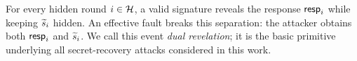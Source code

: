For every hidden round $i\in\mathcal{H}$, a valid signature reveals the
response $\mathsf{resp}_i$ while keeping $\widetilde{s}_i$ hidden. An effective
fault breaks this separation: the attacker obtains both
$\mathsf{resp}_i$ and $\widetilde{s}_i$. We call this event
\emph{dual revelation}; it is the basic primitive underlying all
secret-recovery attacks considered in this work.

